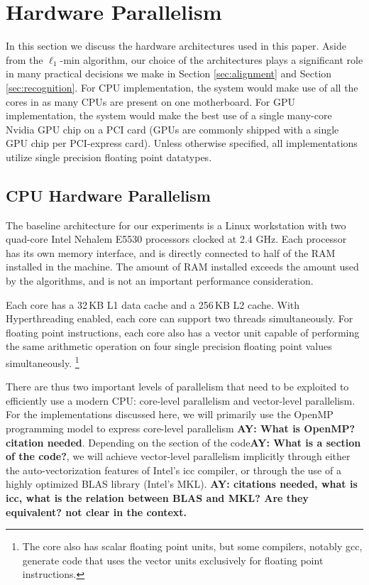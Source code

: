 \documentclass[10pt,twocolumn,letterpaper]{article}
\begin{document}
\section{Hardware Parallelism} \label{sec:parallelism} 
In this section we discuss the hardware architectures used in this paper. Aside
from the $\ell_1$-min algorithm, our choice of the architectures plays a
significant role in many practical decisions we make in Section
\ref{sec:alignment} and Section \ref{sec:recognition}.  For CPU implementation,
the system would make use of all the cores in as many CPUs are present on one
motherboard.  For GPU implementation, the system would make the best use of a
single many-core Nvidia GPU chip  on a PCI card (GPUs are commonly shipped with
a single GPU chip per PCI-express card).  Unless otherwise specified, all
implementations utilize single precision floating point datatypes.  

\subsection{CPU Hardware Parallelism} 
The baseline architecture for our experiments is a Linux workstation with two
quad-core Intel Nehalem E5530 processors clocked at 2.4 GHz.  Each processor
has its own memory interface, and is directly connected to half of the RAM
installed in the machine.  The amount of RAM installed exceeds the amount used
by the algorithms, and is not an important performance consideration.  

Each core has a 32\,KB L1 data cache and a 256\,KB L2 cache. With Hyperthreading
enabled, each core can support two threads simultaneously.  For floating point
instructions, each core also has a vector unit capable of performing the same
arithmetic operation on four single precision floating point values
simultaneously.  \footnote{The core also has scalar floating point units, but
some compilers, notably gcc, generate code that uses the vector units
exclusively for floating point instructions.} 

There are thus two important levels of parallelism that need to be exploited to
efficiently use a modern CPU: core-level parallelism and vector-level
parallelism.  For the implementations discussed here, we will primarily use the
OpenMP programming model to express core-level parallelism {\bf AY: What is
OpenMP? citation needed}.  Depending on the section of the code{\bf AY: What is
a section of the code?}, we will achieve vector-level parallelism implicitly
through either the auto-vectorization features of Intel's icc compiler, or
through the use of a highly optimized BLAS library (Intel's MKL). {\bf AY:
citations needed, what is icc, what is the relation between BLAS and MKL? Are
they equivalent? not clear in the context.}
\end{document}
